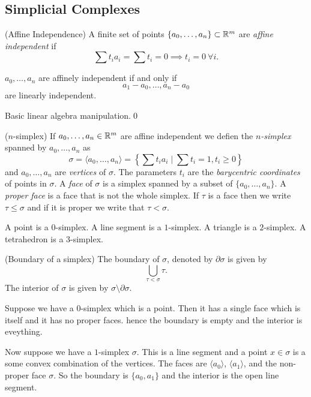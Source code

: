 \documentclass{article}
\begin{document}
\subsection{Simplicial Complexes}
\begin{definition}
	(Affine Independence) A finite set of points $ \{a_0,\dots, a_n\} \subset \mathbb{R}^m $ are \textit{affine independent} if
	\[
		\sum t_ia_i = \sum t_i = 0\implies t_i =0 \ \forall i.
	\]
\end{definition}
\begin{lemma}
  $ a_0,\dots, a_n $ are affinely independent if and only if 
  \[
    a_1-a_0,\dots, a_n-a_0
  \]
  are linearly independent.
\end{lemma}
\pf Basic linear algebra manipulation.\qed
\begin{definition}
	($ n $-simplex) If $ a_0,\dots, a_n\in \mathbb{R}^m $ are affine independent we defien the $ n $\textit{-simplex} spanned by $ a_0,\dots, a_n $ as 
	\[
		\sigma =\langle a_0,\dots, a_n\rangle = \left\{ \sum t_ia_i\mid \sum t_i  = 1, t_i \ge 0 \right\}
	\]
	and $ a_0,\dots, a_n $ are \textit{vertices} of $ \sigma $. The parameters $ t_i $ are the \textit{barycentric coordinates} of points in $ \sigma $. A \textit{face} of $ \sigma $ is a simplex spanned by a subset of $ \{a_0,\dots, a_n\} $. A \textit{proper face} is a face that is not the whole simplex. If $ \tau $ is a face then we write $ \tau \le \sigma $ and if it is proper we write that $ \tau <\sigma $.
\end{definition}
\begin{example}
  A point is a $ 0 $-simplex. A line segment is a $ 1 $-simplex. A triangle is a $ 2 $-simplex. A  tetrahedron is a $ 3 $-simplex.
\end{example}
\begin{definition}
	(Boundary of a simplex) The boundary of $ \sigma $, denoted by $ \partial \sigma $ is given by
	\[
		\bigcup_{\tau < \sigma} \tau.
	\]
	The interior of $ \sigma $ is given by $ \sigma\setminus \partial \sigma $.
\end{definition}
\begin{example}
  Suppose we have a $ 0 $-simplex which is a point. Then it has a single face which is itself and it has no proper faces. hence the boundary is empty and the interior is eveything.
\end{example}
\begin{example}
	Now suppose we have a $ 1 $-simplex $ \sigma $. This is a line segment and a point $ x\in \sigma $ is a some convex combination of the vertices. The faces are $ \langle a_0\rangle $, $ \langle a_1\rangle $, and the non-proper face $ \sigma $. So the boundary is $ \{a_0,a_1\} $ and the interior is the open line segment.
\end{example}
\end{document}
